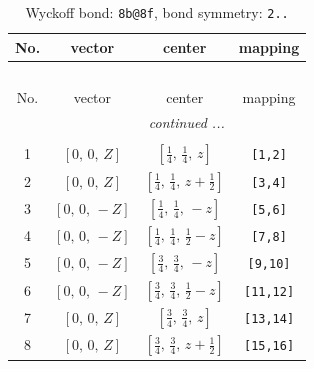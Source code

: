 \documentclass[fleqn,8pt]{jsarticle}
\begin{document}
\begin{longtable}{cccc}
\caption{Wyckoff bond: {\tt 8b@8f}, bond symmetry: {\tt 2..}}
 \\
 \hline \hline
No. & vector & center & mapping \\ \hline \endfirsthead

\multicolumn{3}{l}{\tablename\ \thetable{}} \\
 \hline \hline
No. & vector & center & mapping \\ \hline \endhead

 \hline \hline
\multicolumn{3}{r}{\footnotesize\it continued ...} \\ \endfoot

 \hline \hline
\multicolumn{3}{r}{} \\ \endlastfoot

1 & $\left[ 0,\, 0,\, Z \right]$ & $\left[ \frac{1}{4},\, \frac{1}{4},\, z \right]$ & {\tt [1,2]} \\ \hline
2 & $\left[ 0,\, 0,\, Z \right]$ & $\left[ \frac{1}{4},\, \frac{1}{4},\, z + \frac{1}{2} \right]$ & {\tt [3,4]} \\ \hline
3 & $\left[ 0,\, 0,\, - Z \right]$ & $\left[ \frac{1}{4},\, \frac{1}{4},\, - z \right]$ & {\tt [5,6]} \\ \hline
4 & $\left[ 0,\, 0,\, - Z \right]$ & $\left[ \frac{1}{4},\, \frac{1}{4},\, \frac{1}{2} - z \right]$ & {\tt [7,8]} \\ \hline
5 & $\left[ 0,\, 0,\, - Z \right]$ & $\left[ \frac{3}{4},\, \frac{3}{4},\, - z \right]$ & {\tt [9,10]} \\ \hline
6 & $\left[ 0,\, 0,\, - Z \right]$ & $\left[ \frac{3}{4},\, \frac{3}{4},\, \frac{1}{2} - z \right]$ & {\tt [11,12]} \\ \hline
7 & $\left[ 0,\, 0,\, Z \right]$ & $\left[ \frac{3}{4},\, \frac{3}{4},\, z \right]$ & {\tt [13,14]} \\ \hline
8 & $\left[ 0,\, 0,\, Z \right]$ & $\left[ \frac{3}{4},\, \frac{3}{4},\, z + \frac{1}{2} \right]$ & {\tt [15,16]} \\
\end{longtable}
\renewcommand{\arraystretch}{1.2}
\end{document}

